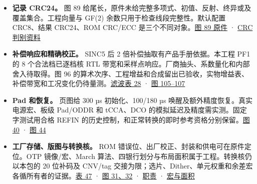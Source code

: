 \documentclass[UTF8,fontset=none,zihao=-4,a4paper]{ctexart}
\begin{document}
\begin{itemize}
\item \textbf{记录 CRC24。} 图 89 给尾长，原件未给完整多项式、\allowbreak{}初值、\allowbreak{}反射、\allowbreak{}终异或及覆盖集合。工程向量与 GF(2) 余数只用于检查线段完整性。默认配置 CRC8、\allowbreak{}结果 CRC24、\allowbreak{}ROM CRC/ECC 是三个不同对象。\href{https://www.analog.com/media/en/technical-documentation/data-sheets/ad4080.pdf\#page=60}{图 89 原件} · \href{https://github.com/defineiocc02/20bit\_SAR\_ADC\_Behaviour\_Verification/blob/feat/ad4080-peripherals/rtl/ad4080\_periph/io/adi\_crc/README.md}{CRC 判别资料}\par
\item \textbf{补偿响应和精确校正。} SINC5 后 2 倍补偿抽取有产品手册依据。本工程 PF1 的 8 个合法档已逐档核 RTL 带宽和采样点响应。厂商抽头、\allowbreak{}系数量化和内部舍入待取得。图 96 的算术次序、\allowbreak{}工程增益和合成留出已验收，实物增益表、\allowbreak{}补偿带宽和工况变化仍待量测。\href{https://www.analog.com/media/en/technical-documentation/data-sheets/ad4080.pdf\#page=64}{滤波表 28} · \href{https://www.analog.com/media/en/technical-documentation/data-sheets/ad4080.pdf\#page=70}{图 105–107}\par
\item \textbf{Pad 和恢复。} 页图给 300 µs 初始化、\allowbreak{}100/180 µs 唤醒及额外精度恢复。真实电源宏、\allowbreak{}板级 Pad/\relax{}ODDR 和 tCCA、\allowbreak{}DCO 的模拟延迟及精度需实测。固定字测试用合格 REFIN 的历史控制，和正常转换的即时参考资格分别保留。\href{https://www.analog.com/media/en/technical-documentation/data-sheets/ad4080.pdf\#page=24}{图 40} · \href{https://www.analog.com/media/en/technical-documentation/data-sheets/ad4080.pdf\#page=27}{图 44}\par
\item \textbf{工厂存储、\allowbreak{}版图与转换核。} ROM 错误位、\allowbreak{}出厂校正、\allowbreak{}封装和供电可在原件定位。OTP 镜像/宏、\allowbreak{}March 算法、\allowbreak{}四银行划分与布局面积属于工程。转换核仍以本包的 20 位补码及 CNV/tag 交接为限；选片、\allowbreak{}Dither、\allowbreak{}单元权重和余差宏各循所有者的证据。\href{https://www.analog.com/media/en/technical-documentation/data-sheets/ad4080.pdf\#page=83}{表 47} · \href{https://www.analog.com/media/en/technical-documentation/data-sheets/ad4080.pdf\#page=19}{图 31、\allowbreak{}32} · \href{https://github.com/defineiocc02/20bit\_SAR\_ADC\_Behaviour\_Verification/blob/feat/ad4080-peripherals/rtl/ad4080\_periph/interfaces/function\_ownership.csv}{职责} · \href{https://github.com/defineiocc02/20bit\_SAR\_ADC\_Behaviour\_Verification/blob/feat/ad4080-peripherals/rtl/ad4080\_periph/budget/README.md}{宏与面积}\par
\end{itemize}
\end{document}

